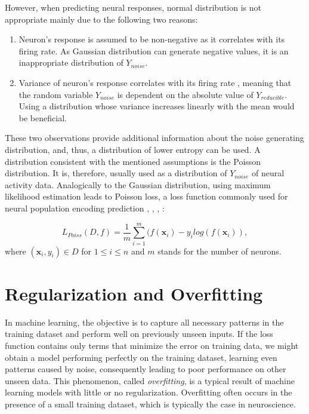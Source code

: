 However, when predicting neural responses, normal distribution is not appropriate mainly due to the following two reasons:
\begin{enumerate}
	\item Neuron’s response is assumed to be non-negative as it correlates with its firing rate. As Gaussian distribution can generate negative values, it is an inappropriate distribution of $Y_{noise}$.
	\item Variance of neuron’s response correlates with its firing rate \citep{goris2014partitioning}, meaning that the random variable $Y_{noise}$ is dependent on the absolute value of $Y_{reducible}$. Using a distribution whose variance increases linearly with the mean would be beneficial.
\end{enumerate}


These two observations provide additional information about the noise generating distribution, and, thus, a distribution of lower entropy can be used. A distribution consistent with the mentioned assumptions is the Poisson distribution. It is, therefore, usually used as a distribution of $Y_{noise}$ of neural activity data. Analogically to the Gaussian distribution, using maximum likelihood estimation leads to Poisson loss, a loss function commonly used for neural population encoding prediction \citep{cadena2019deep}, \citep{klindt2017neural}, \citep{sinz2018stimulus}, \citep{lurz2021generalization}:

\begin{defn}\label{def01:6}
	\begin{equation}
		L_{Poiss}(D, f) = \frac{1}{m} \sum_{i=1}^m (f(\textbf{x}_i) - y_i log(f(\textbf{x}_i)),
	\end{equation}
	where $(\textbf{x}_i, y_i) \in D$ for $1 \leq i \leq n$ and $m$ stands for the number of neurons.
\end{defn}


\section{Regularization and Overfitting}

In machine learning, the objective is to capture all necessary patterns in the training dataset and perform well on previously unseen inputs. If the loss function contains only terms that minimize the error on training data, we might obtain a model performing perfectly on the training dataset, learning even patterns caused by noise, consequently leading to poor performance on other unseen data. This phenomenon, called \emph{overfitting}, is a typical result of machine learning models with little or no regularization. Overfitting often occurs in the presence of a small training dataset, which is typically the case in neuroscience.


